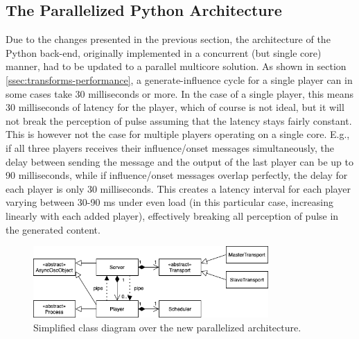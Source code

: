\subsection{The Parallelized Python Architecture}\label{ssec:python-architecture}
Due to the changes presented in the previous section, the architecture of the Python back-end, originally implemented in a concurrent (but single core) manner, had to be updated to a parallel multicore solution. As shown in section \ref{ssec:transforms-performance}, a generate-influence cycle for a single player can in some cases take 30 milliseconds or more. In the case of a single player, this means 30 milliseconds of latency for the player, which of course is not ideal, but it will not break the perception of pulse assuming that the latency stays fairly constant. This is however not the case for multiple players operating on a single core. E.g., if all three players receives their influence/onset messages simultaneously, the delay between sending the message and the output of the last player can be up to 90 milliseconds, while if influence/onset messages overlap perfectly, the delay for each player is only 30 milliseconds. This creates a latency interval for each player varying between 30-90 ms under even load (in this particular case, increasing linearly with each added player), effectively breaking all perception of pulse in the generated content.

 \begin{figure}[h!]
    \centering        
 	\includegraphics[width=0.80\textwidth, keepaspectratio]{figures/multicore-server.png}
    \caption{Simplified class diagram over the new parallelized architecture.}
    \label{fig:multicore-server-uml}
\end{figure}

